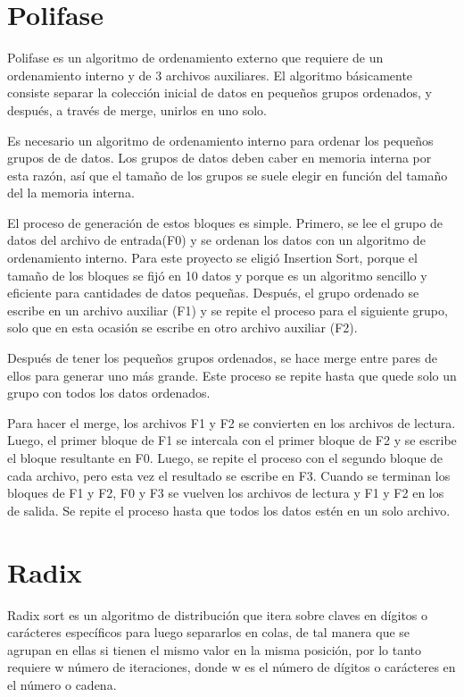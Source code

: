 \documentclass[11pt]{article}
\begin{document}
\section{Polifase}
Polifase es un algoritmo de ordenamiento externo que requiere de un ordenamiento interno y de 3 archivos auxiliares. El algoritmo básicamente consiste separar la colección inicial de datos en pequeños grupos ordenados, y después, a través de merge, unirlos en uno solo. 
\par
Es necesario un algoritmo de ordenamiento interno para ordenar los pequeños grupos de de datos. Los grupos de datos deben caber en memoria interna por esta razón, así que el tamaño de los grupos se suele elegir en función del tamaño del la memoria interna.
\par
El proceso de generación de estos bloques es simple. Primero, se lee el grupo de datos del archivo de entrada(F0) y se ordenan los datos con un algoritmo de ordenamiento interno. Para este proyecto se eligió Insertion Sort, porque el tamaño de los bloques se fijó en 10 datos y porque es un algoritmo sencillo y eficiente para cantidades de datos pequeñas. Después, el grupo ordenado se escribe en un archivo auxiliar (F1) y se repite el proceso para el siguiente grupo, solo que en esta ocasión se escribe en otro archivo auxiliar (F2).
 
\par 
Después de tener los pequeños grupos ordenados, se hace merge entre pares de ellos para generar uno más grande. Este proceso se repite hasta que quede solo un grupo con todos los datos ordenados.
\par
Para hacer el merge, los archivos F1 y F2 se convierten en los archivos de lectura. Luego, el primer bloque de F1 se intercala con el primer bloque de F2 y se escribe el bloque resultante en F0. Luego, se repite el proceso con el segundo bloque de cada archivo, pero esta vez el resultado se escribe en F3. Cuando se terminan los bloques de F1 y F2, F0 y F3 se vuelven los archivos de lectura y F1 y F2 en los de salida. Se repite el proceso hasta que todos los datos estén en un solo archivo.

\section{Radix}
Radix sort es un algoritmo de distribución que itera sobre claves en dígitos o carácteres específicos para luego separarlos en colas, de tal manera que se agrupan en ellas si tienen el mismo valor en la misma posición, por lo tanto requiere w número de iteraciones, donde w es el número de dígitos o carácteres en el número o cadena.
\end{document}

